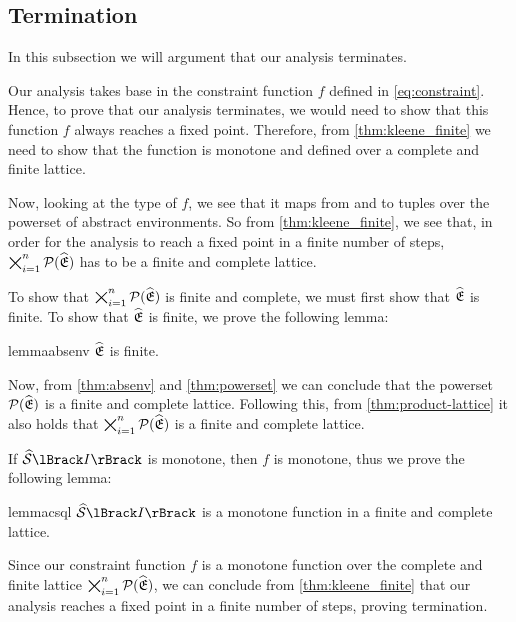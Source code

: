 \subsection{Termination}\label{subsec:termination}

In this subsection we will argument that our analysis terminates.

Our analysis takes base in the constraint function $f$ defined in \autoref{eq:constraint}.
Hence, to prove that our analysis terminates, we would need to show that this function $f$ always reaches a fixed point.
Therefore, from \autoref{thm:kleene_finite} we need to show that the function is monotone and defined over a complete and finite lattice.

Now, looking at the type of $f$, we see that it maps from and to tuples over the powerset of abstract environments.
So from \autoref{thm:kleene_finite}, we see that, in order for the analysis to reach a fixed point in a finite number of steps, $\bigtimes_{i = 1}^n \mathcal{P}(\widehat{\mathfrak{E}})$ has to be a finite and complete lattice.

To show that $\bigtimes_{i = 1}^n \mathcal{P}(\widehat{\mathfrak{E}})$ is finite and complete, we must first show that $\widehat{\mathfrak{E}}$ is finite.
To show that $\widehat{\mathfrak{E}}$ is finite, we prove the following lemma:

\begin{restatable}{lemma}{absenv}\label{thm:absenv}
$\widehat{\mathfrak{E}}$ is finite.
\end{restatable}

Now, from \autoref{thm:absenv} and \autoref{thm:powerset} we can conclude that the powerset $\mathcal{P}(\widehat{\mathfrak{E}})$ is a finite and complete lattice.
Following this, from \autoref{thm:product-lattice} it also holds that $\bigtimes_{i = 1}^n \mathcal{P}(\widehat{\mathfrak{E}})$ is a finite and complete lattice.

If $\abssem{I}$ is monotone, then $f$ is monotone, thus we prove the following lemma:
\begin{restatable}{lemma}{csql}\label{thm:csql}
    $\abssem{I}$ is a monotone function in a finite and complete lattice.
\end{restatable}

Since our constraint function $f$ is a monotone function over the complete and finite lattice $\bigtimes_{i = 1}^n \mathcal{P}(\widehat{\mathfrak{E}})$, we can conclude from \autoref{thm:kleene_finite} that our analysis reaches a fixed point in a finite number of steps, proving termination.
